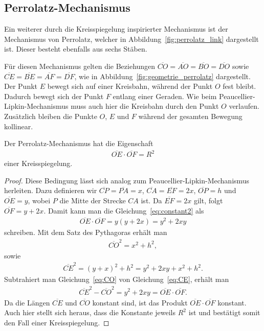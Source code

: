 \subsection{Perrolatz-Mechanismus}
Ein weiterer durch die Kreisspiegelung inspirierter Mechanismus 
ist der Mechanismus von Perrolatz, 
welcher in Abbildung~\ref{fig:perrolatz_link} dargestellt ist.
Dieser besteht ebenfalls aus sechs Stäben.


Für diesen Mechanismus gelten die Beziehungen
$\overline{CO}=\overline{AO}=\overline{BO}=\overline{DO}$ sowie
$\overline{CE}=\overline{BE}=\overline{AF}=\overline{DF}$,
wie in Abbildung~\ref{fig:geometrie_perrolatz} dargestellt.
Der Punkt $E$ bewegt sich auf einer Kreisbahn, während der Punkt $O$ fest bleibt.
Dadurch bewegt sich der Punkt $F$ entlang einer Geraden.
Wie beim Peaucellier-Lipkin-Mechanismus muss auch hier die Kreisbahn 
durch den Punkt $O$ verlaufen.
Zusätzlich bleiben die Punkte $O$, $E$ und $F$ während der gesamten Bewegung kollinear.

\begin{satz}
    Der Perrolatz-Mechanismus hat die Eigenschaft
    \begin{align}
        \overline{OE}\cdot\overline{OF} = R^2
        \label{eq:constant2}
    \end{align}
    einer Kreisspiegelung.
\end{satz}
\begin{proof} 
    Diese Bedingung lässt sich analog zum 
    Peaucellier-Lipkin-Mechanismus herleiten.
    Dazu definieren wir $\overline{CP}=\overline{PA}=x$, $\overline{CA}=\overline{EF}=2x$,
    $\overline{OP}=h$ und $\overline{OE}=y$,
    wobei $P$ die Mitte der Strecke $CA$ ist.
    Da $\overline{EF}=2x$ gilt, folgt $\overline{OF}=y+2x$.
    Damit kann man die Gleichung~\eqref{eq:constant2} als
    \begin{align*}
        \overline{OE}\cdot\overline{OF}
        =
        y(y+2x)
        =
        y^2+2xy
    \end{align*}
    schreiben.
    Mit dem Satz des Pythagoras erhält man
    \begin{align}
        \overline{CO}^2
        =
        x^2+h^2,
        \label{eq:CO}
    \end{align}
    sowie
    \begin{align}
        \overline{CE}^2
        =
        (y+x)^2+h^2
        =
        y^2+2xy+x^2+h^2.
        \label{eq:CE}
    \end{align}
    Subtrahiert man Gleichung~\eqref{eq:CO} von Gleichung~\eqref{eq:CE}, 
    erhält man
    \begin{align*}
        \overline{CE}^2-\overline{CO}^2
        =
        y^2+2xy
        =
        \overline{OE}\cdot\overline{OF}.
    \end{align*}
    Da die Längen $\overline{CE}$ und $\overline{CO}$ konstant sind, 
    ist das Produkt $\overline{OE}\cdot\overline{OF}$ konstant.
    Auch hier stellt sich heraus, dass die Konstante jeweils $R^2$ ist und
    bestätigt somit den Fall einer Kreisspiegelung.
\end{proof}
